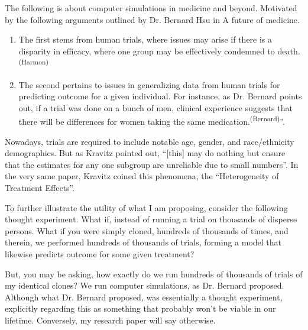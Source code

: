 


The following is about computer simulations in medicine and beyond. Motivated by the following arguments outlined by Dr. Bernard Hsu in A future of medicine.


\begin{enumerate}
    \item The first stems from human trials, where issues may arise if there is a disparity in efficacy, where one group may be effectively condemned to death.\textsuperscript{(Harmon)}
     
    \item The second pertains to issues in generalizing data from human trials for predicting outcome for a given individual. For instance, as Dr. Bernard points out, if a trial was done on a bunch of men, clinical experience suggests that there will be differences for women taking the same medication.\textsuperscript{(Bernard)}''. 
\end{enumerate}

Nowadays, trials are required to include notable age, gender, and race/ethnicity demographics. But as Kravitz pointed out, ``[this] may do nothing but ensure that the estimates for any one subgroup are unreliable due to small numbers''. In the very same paper, Kravitz coined this phenomena, the ``Heterogeneity of Treatment Effects''.

To further illustrate the utility of what I am proposing, consider the following thought experiment. What if, instead of running a trial on thousands of disperse persons. What if you were simply cloned, hundreds of thousands of times, and therein, we performed hundreds of thousands of trials, forming a model that likewise predicts outcome for some given treatment?

But, you may be asking, how exactly do we run hundreds of thousands of trials of my identical clones? We run computer simulations, as Dr. Bernard proposed. Although what Dr. Bernard proposed, was essentially a thought experiment, explicitly regarding this as something that probably won't be viable in our lifetime. Conversely, my research paper will say otherwise.

